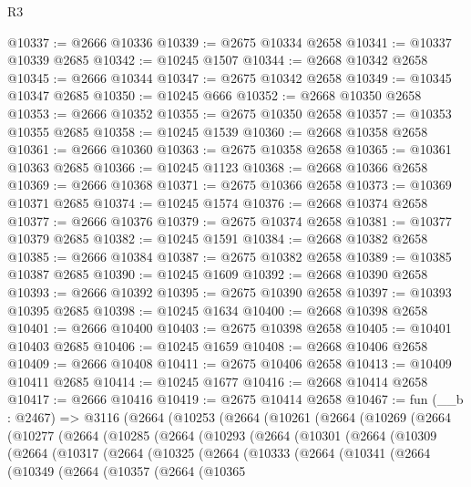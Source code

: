 \begin{lexlean}{R3}
\begin{coremodule}
@10337 := @2666 @10336
@10339 := @2675 @10334 @2658
@10341 := @10337 @10339 @2685
@10342 := @10245 @1507
@10344 := @2668 @10342 @2658
@10345 := @2666 @10344
@10347 := @2675 @10342 @2658
@10349 := @10345 @10347 @2685
@10350 := @10245 @666
@10352 := @2668 @10350 @2658
@10353 := @2666 @10352
@10355 := @2675 @10350 @2658
@10357 := @10353 @10355 @2685
@10358 := @10245 @1539
@10360 := @2668 @10358 @2658
@10361 := @2666 @10360
@10363 := @2675 @10358 @2658
@10365 := @10361 @10363 @2685
@10366 := @10245 @1123
@10368 := @2668 @10366 @2658
@10369 := @2666 @10368
@10371 := @2675 @10366 @2658
@10373 := @10369 @10371 @2685
@10374 := @10245 @1574
@10376 := @2668 @10374 @2658
@10377 := @2666 @10376
@10379 := @2675 @10374 @2658
@10381 := @10377 @10379 @2685
@10382 := @10245 @1591
@10384 := @2668 @10382 @2658
@10385 := @2666 @10384
@10387 := @2675 @10382 @2658
@10389 := @10385 @10387 @2685
@10390 := @10245 @1609
@10392 := @2668 @10390 @2658
@10393 := @2666 @10392
@10395 := @2675 @10390 @2658
@10397 := @10393 @10395 @2685
@10398 := @10245 @1634
@10400 := @2668 @10398 @2658
@10401 := @2666 @10400
@10403 := @2675 @10398 @2658
@10405 := @10401 @10403 @2685
@10406 := @10245 @1659
@10408 := @2668 @10406 @2658
@10409 := @2666 @10408
@10411 := @2675 @10406 @2658
@10413 := @10409 @10411 @2685
@10414 := @10245 @1677
@10416 := @2668 @10414 @2658
@10417 := @2666 @10416
@10419 := @2675 @10414 @2658
@10467 := fun (__b : @2467) =>
  @3116
    (@2664
      (@10253
        (@2664
          (@10261
            (@2664
              (@10269
                (@2664
                  (@10277
                    (@2664
                      (@10285
                        (@2664
                          (@10293
                            (@2664
                              (@10301
                                (@2664
                                  (@10309
                                    (@2664
                                      (@10317
                                        (@2664
                                          (@10325
                                            (@2664
                                              (@10333
                                                (@2664
                                                  (@10341
                                                    (@2664
                                                      (@10349
                                                        (@2664
                                                          (@10357
                                                            (@2664
                                                              (@10365

\end{coremodule}
\end{lexlean}
